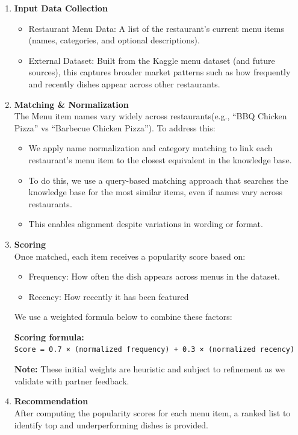 \documentclass[
  11pt,
  a4paper,
  DIV=11,
  numbers=noendperiod]{scrartcl}
\providecommand{\tightlist}{%
  \setlength{\itemsep}{0pt}\setlength{\parskip}{0pt}}\usepackage{longtable,booktabs,array}
\begin{document}
\begin{enumerate}
\def\labelenumi{\arabic{enumi}.}
\item
  \textbf{Input Data Collection}

  \begin{itemize}
  \tightlist
  \item
    Restaurant Menu Data: A list of the restaurant's current menu items
    (names, categories, and optional descriptions).
  \item
    External Dataset: Built from the Kaggle menu dataset (and future
    sources), this captures broader market patterns such as how
    frequently and recently dishes appear across other restaurants.
  \end{itemize}
\item
  \textbf{Matching \& Normalization}\\
  The Menu item names vary widely across restaurants(e.g., ``BBQ Chicken
  Pizza'' vs ``Barbecue Chicken Pizza''). To address this:

  \begin{itemize}
  \tightlist
  \item
    We apply name normalization and category matching to link each
    restaurant's menu item to the closest equivalent in the knowledge
    base.
  \item
    To do this, we use a query-based matching approach that searches the
    knowledge base for the most similar items, even if names vary across
    restaurants.
  \item
    This enables alignment despite variations in wording or format.
  \end{itemize}
\item
  \textbf{Scoring}\\
  Once matched, each item receives a popularity score based on:

  \begin{itemize}
  \tightlist
  \item
    Frequency: How often the dish appears across menus in the dataset.
  \item
    Recency: How recently it has been featured
  \end{itemize}

  We use a weighted formula below to combine these factors:

  \textbf{Scoring formula:}\\
  \texttt{Score\ =\ 0.7\ ×\ (normalized\ frequency)\ +\ 0.3\ ×\ (normalized\ recency)}

  \textbf{Note:} These initial weights are heuristic and subject to
  refinement as we validate with partner feedback.
\item
  \textbf{Recommendation}\\
  After computing the popularity scores for each menu item, a ranked
  list to identify top and underperforming dishes is provided.
\end{enumerate}
\end{document}
